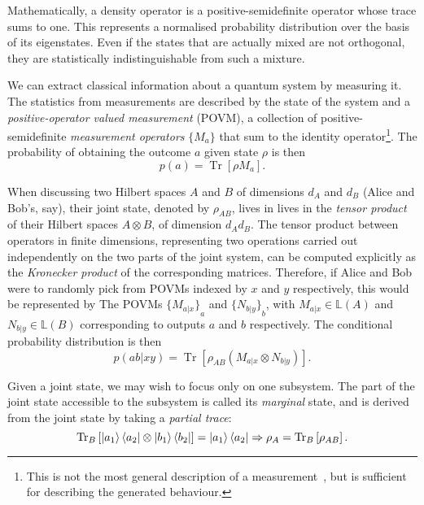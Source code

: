 \documentclass[10pt, a4paper]{article}
\numberwithin{equation}{section} %
\theoremstyle{definition}
\theoremstyle{plain}
\newcommand{\?}{\mathrel{?}} %
\newcommand{\Lin}[1]{\mathbb{L}\left(#1\right)}
\newcommand{\Tr}[2][]{\mathop{\mathrm{Tr}#1}\left[ #2 \right]} %
\begin{document}
\begin{appendices}
                    Mathematically, a density operator is a positive-semidefinite operator whose trace sums to one. This represents a normalised probability distribution over the basis of its eigenstates. Even if the states that are actually mixed are not orthogonal, they are statistically indistinguishable from such a mixture.

                    We can extract classical information about a quantum system by measuring it. The statistics from measurements are described by the state of the system and a \emph{positive-operator valued measurement} (POVM), a collection of positive-semidefinite \emph{measurement operators} \(\{M_a\}\) that sum to the identity operator\footnote{This is not the most general description of a measurement~\cite[Box 2.5]{NielsenChuang}, but is sufficient for describing the generated behaviour.}. The probability of obtaining the outcome \(a\) given state \(\rho\) is then
                    \begin{equation}
                      p(a) = \Tr{\rho M_a}.
                    \end{equation}

                    When discussing two Hilbert spaces \(A\) and \(B\) of dimensions \(d_A\) and \(d_B\) (Alice and Bob's, say), their joint state, denoted by \(\rho_{AB}\), lives in lives in the \emph{tensor product} of their Hilbert spaces \(A \otimes B\), of dimension \(d_A d_B\). The tensor product between operators in finite dimensions, representing two operations carried out independently on the two parts of the joint system, can be computed explicitly as the \emph{Kronecker product} of the corresponding matrices. Therefore, if Alice and Bob were to randomly pick from POVMs indexed by \(x\) and \(y\) respectively, this would be represented by The POVMs \({\{M_{a|x}\}}_a\) and \({\{N_{b|y}\}}_b\), with \(M_{a|x} \in \Lin{A}\) and \(N_{b|y} \in \Lin{B}\) corresponding to outputs \(a\) and \(b\) respectively. The conditional probability distribution is then
                    \begin{equation}
                      p(ab|xy) = \Tr{\rho_{AB} \left(M_{a|x} \otimes N_{b|y}\right) }.
                    \end{equation}

                    Given a joint state, we may wish to focus only on one subsystem. The part of the joint state accessible to the subsystem is called its \emph{marginal} state, and is derived from the joint state by taking a \emph{partial trace}:
                    \begin{equation}
                      \Tr[_B]{\ket{a_1}\bra{a_2} \otimes \ket{b_1}\bra{b_2}} = \ket{a_1}\bra{a_2} \Rightarrow \rho_A = \Tr[_B]{\rho_{AB}}.
                    \end{equation}


\end{appendices}
\end{document}

